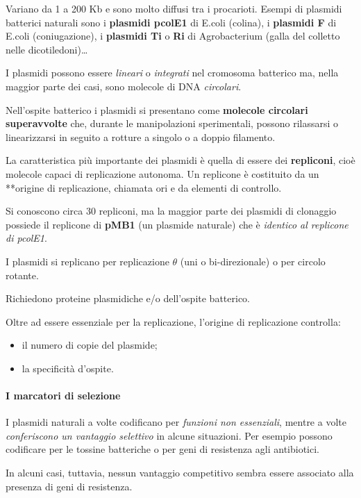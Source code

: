 \documentclass[]{article}
\begin{document}
Variano da 1 a 200 Kb e sono molto diffusi tra i procarioti. Esempi di
plasmidi batterici naturali sono i \textbf{plasmidi pcolE1} di E.coli
(colina), i \textbf{plasmidi F} di E.coli (coniugazione), i
\textbf{plasmidi Ti} o \textbf{Ri} di Agrobacterium (galla del colletto
nelle dicotiledoni)\ldots{}

I plasmidi possono essere \emph{lineari} o \emph{integrati} nel
cromosoma batterico ma, nella maggior parte dei casi, sono molecole di
DNA \emph{circolari}.

Nell'ospite batterico i plasmidi si presentano come \textbf{molecole
circolari superavvolte} che, durante le manipolazioni sperimentali,
possono rilassarsi o linearizzarsi in seguito a rotture a singolo o a
doppio filamento.

La caratteristica più importante dei plasmidi è quella di essere dei
\textbf{repliconi}, cioè molecole capaci di replicazione autonoma. Un
replicone è costituito da un **origine di replicazione, chiamata ori e
da elementi di controllo.

Si conoscono circa 30 repliconi, ma la maggior parte dei plasmidi di
clonaggio possiede il replicone di \textbf{pMB1} (un plasmide naturale)
che è \emph{identico al replicone di pcolE1}.

I plasmidi si replicano per replicazione \(\theta\) (uni o
bi-direzionale) o per circolo rotante.

Richiedono proteine plasmidiche e/o dell'ospite batterico.

Oltre ad essere essenziale per la replicazione, l'origine di
replicazione controlla:

\begin{itemize}
\itemsep1pt\parskip0pt
\item
  il numero di copie del plasmide;
\item
  la specificità d'ospite.
\end{itemize}

\paragraph{I marcatori di selezione}\label{i-marcatori-di-selezione}

I plasmidi naturali a volte codificano per \emph{funzioni non
essenziali}, mentre a volte \emph{conferiscono un vantaggio selettivo}
in alcune situazioni. Per esempio possono codificare per le tossine
batteriche o per geni di resistenza agli antibiotici.

In alcuni casi, tuttavia, nessun vantaggio competitivo sembra essere
associato alla presenza di geni di resistenza.
\end{document}
